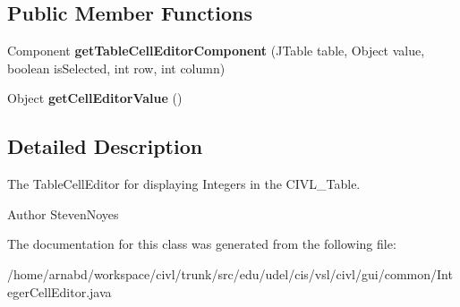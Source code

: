 \subsection*{Public Member Functions}
\begin{DoxyCompactItemize}
\item 
\hypertarget{classedu_1_1udel_1_1cis_1_1vsl_1_1civl_1_1gui_1_1common_1_1IntegerCellEditor_a41d4331d9ced1c0d171a32042e7d9be7}{}Component {\bfseries get\+Table\+Cell\+Editor\+Component} (J\+Table table, Object value, boolean is\+Selected, int row, int column)\label{classedu_1_1udel_1_1cis_1_1vsl_1_1civl_1_1gui_1_1common_1_1IntegerCellEditor_a41d4331d9ced1c0d171a32042e7d9be7}

\item 
\hypertarget{classedu_1_1udel_1_1cis_1_1vsl_1_1civl_1_1gui_1_1common_1_1IntegerCellEditor_a7d94406dd4e5dcccbd547fc90e0a473a}{}Object {\bfseries get\+Cell\+Editor\+Value} ()\label{classedu_1_1udel_1_1cis_1_1vsl_1_1civl_1_1gui_1_1common_1_1IntegerCellEditor_a7d94406dd4e5dcccbd547fc90e0a473a}

\end{DoxyCompactItemize}


\subsection{Detailed Description}
The Table\+Cell\+Editor for displaying Integers in the C\+I\+V\+L\+\_\+\+Table. 

\begin{DoxyAuthor}{Author}
Steven\+Noyes 
\end{DoxyAuthor}


The documentation for this class was generated from the following file\+:\begin{DoxyCompactItemize}
\item 
/home/arnabd/workspace/civl/trunk/src/edu/udel/cis/vsl/civl/gui/common/Integer\+Cell\+Editor.\+java\end{DoxyCompactItemize}

